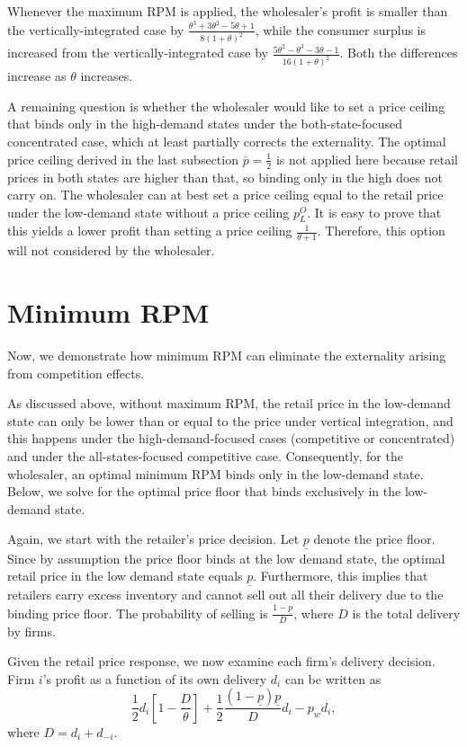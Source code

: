 \documentclass[12pt]{article}
\begin{document}
Whenever the maximum RPM is applied, the wholesaler's profit is smaller than the vertically-integrated case by $\frac{\theta^3 + 3\theta^2 - 5\theta + 1}{8(1 + \theta)^2}$, while the consumer surplus is increased from the vertically-integrated case by $\frac{5\theta^2 - \theta^3 - 3\theta - 1}{16(1+\theta)^2}$. Both the differences increase as $\theta$ increases. 

A remaining question is whether the wholesaler would like to set a price ceiling that binds only in the high-demand states under the both-state-focused concentrated case, which at least partially corrects the externality. The optimal price ceiling derived in the last subsection $\bar{p} = \frac{1}{2}$ is not applied here because retail prices in both states are higher than that, so binding only in the high does not carry on. The wholesaler can at best set a price ceiling equal to the retail price under the low-demand state without a price ceiling $p^O_L$. It is easy to prove that this yields a lower profit than setting a price ceiling $\frac{1}{\theta + 1}$. Therefore, this option will not considered by the wholesaler. 


\section{Minimum RPM}

Now, we demonstrate how minimum RPM can eliminate the externality arising from competition effects.

As discussed above, without maximum RPM, the retail price in the low-demand state can only be lower than or equal to the price under vertical integration, and this happens under the high-demand-focused cases (competitive or concentrated) and under the all-states-focused competitive case. Consequently, for the wholesaler, an optimal minimum RPM binds only in the low-demand state. Below, we solve for the optimal price floor that binds exclusively in the low-demand state.

Again, we start with the retailer's price decision. Let $\underline{p}$ denote the price floor. Since by assumption the price floor binds at the low demand state, the optimal retail price in the low demand state equals $\underline{p}$. Furthermore, this implies that retailers carry excess inventory and cannot sell out all their delivery due to the binding price floor. The probability of selling is $\frac{1 - \underline{p}}{D}$, where $D$ is the total delivery by firms.

Given the retail price response, we now examine each firm's delivery decision. Firm $i$'s profit as a function of its own delivery $d_i$ can be written as
\begin{equation}
	\frac{1}{2}d_i\left[1 - \frac{D}{\theta}\right] + \frac{1}{2}\frac{(1 - \underline{p})\underline{p}}{D}d_i -  p_wd_i,
\end{equation}
where $D = d_i + d_{-i}$.
\end{document}
